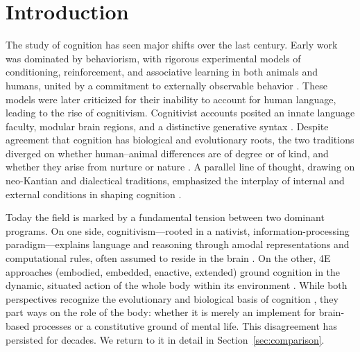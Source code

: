 \section{Introduction}
\label{sec:introduction}

The study of cognition has seen major shifts over the last century. Early work was dominated by behaviorism, with rigorous experimental models of conditioning, reinforcement, and associative learning in both animals and humans, united by a commitment to externally observable behavior \citep{pavlov1927, skinner1938, skinner1953science, thorndike1898, watson1913psychology}. These models were later criticized for their inability to account for human language, leading to the rise of cognitivism. Cognitivist accounts posited an innate language faculty, modular brain regions, and a distinctive generative syntax \citep{chomsky1965aspects, chomsky1986knowledge, fodor1975language, fodor_modularity_1983, pinker1994language, pinker1997mind}. Despite agreement that cognition has biological and evolutionary roots, the two traditions diverged on whether human–animal differences are of degree or of kind, and whether they arise from nurture or nature \citep{chomsky1975reflections, pinker2002blankslate, watson1924behaviorism, skinner1971beyond}. A parallel line of thought, drawing on neo-Kantian and dialectical traditions, emphasized the interplay of internal and external conditions in shaping cognition \citep{piaget-biology-knowledge, piaget1970genetic, ponty1969phenomenology, Merleau-Ponty2013-vs, Vygotsky1978-bk}.

Today the field is marked by a fundamental tension between two dominant programs. On one side, cognitivism—rooted in a nativist, information-processing paradigm—explains language and reasoning through amodal representations and computational rules, often assumed to reside in the brain \citep{chomsky1965aspects, fodor_modularity_1983}. On the other, 4E approaches (embodied, embedded, enactive, extended) ground cognition in the dynamic, situated action of the whole body within its environment \citep{varela1991embodied, maturana1991autopoiesis, noe_action_2004, gallagher2023-book, hutto2012radicalizing}. While both perspectives recognize the evolutionary and biological basis of cognition \citep{chomsky1965aspects, varela1991embodied}, they part ways on the role of the body: whether it is merely an implement for brain-based processes or a constitutive ground of mental life. This disagreement has persisted for decades. We return to it in detail in Section~\ref{sec:comparison}.
 

